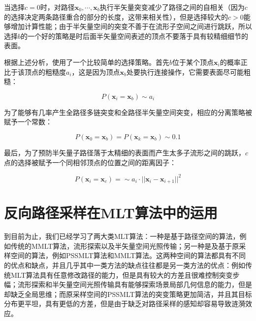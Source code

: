 当选择$c=0$时，对路径$\mathbf{x}_0,\cdots,\mathbf{x}_b$执行半矢量突变减少了路径之间的自相关（因为$c$的选择决定两条路径重合的部分的长度，这带来相关性），但是选择较大的$c>0$能够增加计算性能；由于半矢量空间的突变不善于在流形子空间之间进行跳跃，所以选择$b$的一个好的策略是时后面半矢量空间表述的顶点不要落于具有较精细细节的表面。

根据上述分析，\cite{a:ImprovedHalfVectorSpaceLightTransport}使用了一个比较简单的选择策略。首先$b$位于某个顶点$\mathbf{x}_i$的概率正比于该顶点的粗糙度$a_i$，这是因为顶点$\mathbf{x}_b$处要执行连接操作，它需要表面尽可能粗糙：

\begin{equation}
	P(\mathbf{x}_i=\mathbf{x}_b)\sim a_i
\end{equation}

\noindent 为了能够有几率产生全路径多链突变和全路径半矢量空间突变，相应的分离策略被赋予一个常数：

\begin{equation}
	P(\mathbf{x}_0=\mathbf{x}_b)=P(\mathbf{x}_k=\mathbf{x}_b)\sim 0.1
\end{equation}

\noindent 最后，为了预防半矢量子路径落于太精细的表面而产生太多子流形之间的跳跃，$c$点的选择被赋予一个同相邻顶点的位置之间的距离因子：

\begin{equation}
	P(\mathbf{x}_i=\mathbf{x}_c)=\sim a_i\cdot||\mathbf{x}_i-\mathbf{x}_{i+1}||^{2}
\end{equation}







 
\section{反向路径采样在MLT算法中的运用}\label{sec:mlt-combine-space}
到目前为止，我们已经学习了两大类MLT算法：一种是基于路径空间的算法，例如传统的MMLT算法，流形探索以及半矢量空间光照传输；另一种是及基于原采样空间的算法，例如PSSMLT算法和MMLT算法。这两种空间的算法都具有不同的优点和缺点，并且几乎其中一类方法的缺点往往都是另一类方法的优点：例如传统MLT算法具有任意修改路径的能力，但是具有较大的方差且很难控制突变步幅；流形探索和半矢量空间光照传输具有能够探索场景局部几何信息的能力，但是却缺乏全局思维；而原采样空间的PSSMLT算法的突变策略更加简洁，并且其目标分布更平坦，具有更低的方差，但是由于缺乏对路径采样的感知却容易导致涟漪效应。


